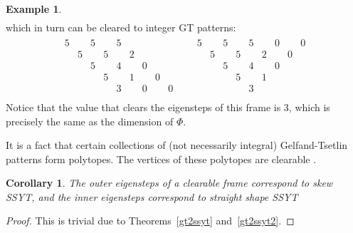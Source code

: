 \documentclass[10pt]{article}
\theoremstyle{plain}
\newtheorem{corollary}[thm]{Corollary}
\theoremstyle{definition}
\newtheorem{example}[thm]{Example}
\begin{document}
\begin{example}
\begin{align*}
\end{align*}
which in turn can be cleared to integer GT patterns:
\begin{align*}
\begin{matrix}
5 & & 5 & & 5 \\
& 5 & & 5 & & 2 \\
& & 5 & & 4 & & 0 \\ 
& & & 5 & & 1 & & 0 \\ 
& & & & 3 & & 0 & & 0 \\ 
\end{matrix}
&&
\begin{matrix}
5 & & 5 & & 5 & & 0 & & 0  \\
& 5 & & 5 & & 2 & & 0  \\
& & 5 & & 4 & & 0 \\ 
& & & 5 & & 1 & & \\ 
& & & & 3 & \\ 
\end{matrix}
\end{align*}
Notice that the value that clears the eigensteps of this frame is 3, which is precisely the same as the dimension of $\Phi$. 
\end{example}
It is a fact that certain collections of (not necessarily integral) Gelfand-Tsetlin patterns form polytopes.  The vertices of these polytopes are clearable \cite{deloera2004vertices}.

\begin{corollary}\label{eig2ssyt}
The outer eigensteps of a clearable frame correspond to skew SSYT, and the inner eigensteps correspond to straight shape SSYT
\end{corollary}

\begin{proof}
This is trivial due to Theorems~\ref{gt2ssyt} and~\ref{gt2ssyt2}.
\end{proof}
\end{document}
